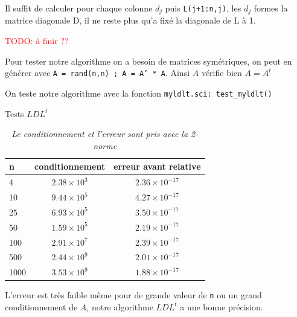 \documentclass{article}
\begin{document}
Il suffit de calculer pour chaque colonne $d_j$ puis \texttt{L(j+1:n,j)}, les $d_j$ formes la matrice diagonale D, il ne reste plus qu'a fixé la diagonale de L à 1.

\textcolor{red}{TODO: à finir ??}

Pour tester notre algorithme on a besoin de matrices symétriques, on peut en générer avec \texttt{A = rand(n,n) ; A = A' * A}.
Ainsi \(A\) vérifie bien \(A = A^t\)
\newline\indent

On teste notre algorithme avec la fonction \texttt{myldlt.sci: test\_myldlt()}

\begin{table}[H]
\renewcommand*\arraystretch{1.3}
\begin{center}
\caption{Tests \(LDL^t\)}
\begin{tabular}{|l|c|c|}
  \hline
  n & conditionnement & erreur avant relative \\
  \hline
	4	& \(2.38 \times 10^3\)	& \(2.36 \times 10^{-17}\) \\
	10	& \(9.44 \times 10^5\)	& \(4.27 \times 10^{-17}\) \\
	25	& \(6.93 \times 10^5\)	& \(3.50 \times 10^{-17}\) \\
	50	& \(1.59 \times 10^5\)	& \(2.19 \times 10^{-17}\) \\
	100	& \(2.91 \times 10^7\)	& \(2.39 \times 10^{-17}\) \\
	500	& \(2.44 \times 10^9\)	& \(2.01 \times 10^{-17}\) \\
	1000& \(3.53 \times 10^9\)	& \(1.88 \times 10^{-17}\) \\
  \hline
\end{tabular}
\caption*{\textit{Le conditionnement et l'erreur sont pris avec la 2-norme}}
\end{center}
\end{table}


L'erreur est très faible même pour de grande valeur de \texttt{n} ou un grand conditionnement de \(A\), notre algorithme \(LDL^t\) a une bonne précision.\newline\indent
\end{document}
